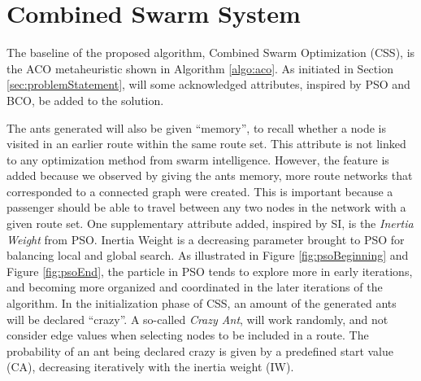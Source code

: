 \section{Combined Swarm System}
\label{section:methodDescription}

The baseline of the proposed algorithm, Combined Swarm Optimization (CSS), is the ACO metaheuristic shown in Algorithm \vref{algo:aco}. As initiated in Section \vref{sec:problemStatement}, will some acknowledged attributes, inspired by PSO and BCO, be added to the solution.

The ants generated will also be given ``memory'', to recall whether a node is visited in an earlier route within the same route set. This attribute is not linked to any optimization method from swarm intelligence. However, the feature is added because we observed by giving the ants memory, more route networks that corresponded to a connected graph were created. This is important because a passenger should be able to travel between any two nodes in the network with a given route set. 
One supplementary attribute added, inspired by SI, is the \textit{Inertia Weight} from PSO. Inertia Weight is a decreasing parameter brought to PSO for balancing local and global search. As illustrated in Figure \vref{fig:psoBeginning} and Figure \vref{fig:psoEnd}, the particle in PSO tends to explore more in early iterations, and becoming more organized and coordinated in the later iterations of the algorithm. In the initialization phase of CSS, an amount of the generated ants will be declared ``crazy''. A so-called \textit{Crazy Ant}, will work randomly, and not consider edge values when selecting nodes to be included in a route. The probability of an ant being declared crazy is given by a predefined start value (CA), decreasing iteratively with the inertia weight (IW). %


